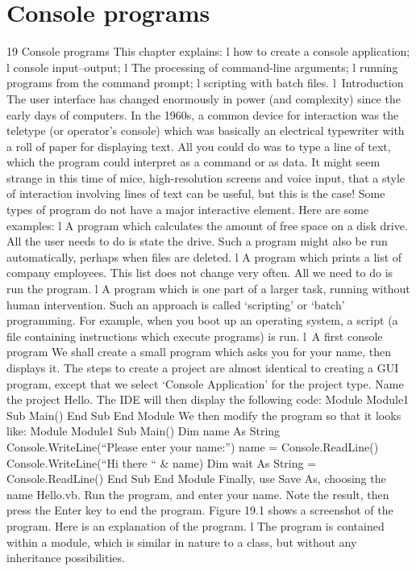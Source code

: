\chapter{Console programs}

19
Console programs
This chapter explains:
l	how to create a console application;
l	console input–output;
l	The processing of command-line arguments;
l	running programs from the command prompt;
l	scripting with batch ﬁles.
l Introduction
The user interface has changed enormously in power (and complexity) since the early days of computers. In the 1960s, a common device for interaction was the teletype (or operator’s console) which was basically an electrical typewriter with a roll of paper for displaying text. All you could do was to type a line of text, which the program could interpret as a command or as data.
It might seem strange in this time of mice, high-resolution screens and voice input, that a style of interaction involving lines of text can be useful, but this is the case! Some types of program do not have a major interactive element. Here are some examples:
l	A program which calculates the amount of free space on a disk drive. All the user needs to do is state the drive. Such a program might also be run automatically, perhaps when ﬁles are deleted.
l	A program which prints a list of company employees. This list does not change very often. All we need to do is run the program.
l	A program which is one part of a larger task, running without human intervention.
Such an approach is called ‘scripting’ or ‘batch’ programming. For example, when you boot up an operating system, a script (a ﬁle containing instructions which execute programs) is run.
l A ﬁrst console program
We shall create a small program which asks you for your name, then displays it. The steps to create a project are almost identical to creating a GUI program, except that we select ‘Console Application’ for the project type. Name the project Hello. The IDE will then display the following code:
Module Module1
	Sub Main()
	End Sub
End Module
We then modify the program so that it looks like:
Module Module1
	Sub Main()
		Dim name As String
		Console.WriteLine(“Please enter your name:”)
		name = Console.ReadLine()
		Console.WriteLine(“Hi there “ & name)
		Dim wait As String = Console.ReadLine()
	End Sub
End Module
Finally, use Save As, choosing the name Hello.vb. Run the program, and enter your name. Note the result, then press the Enter key to end the program. Figure 19.1 shows a screenshot of the program. Here is an explanation of the program.
l	The program is contained within a module, which is similar in nature to a class, but without any inheritance possibilities.
